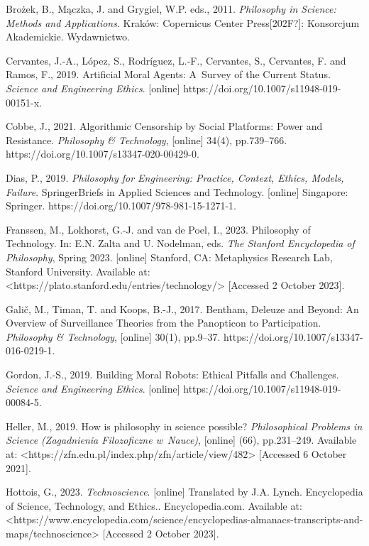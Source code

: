 Brożek, B., Mączka, J. and Grygiel, W.P. eds., 2011. \textit{Philosophy in Science: Methods and Applications}. Kraków: Copernicus Center Press[202F?]: Konsorcjum Akademickie. Wydawnictwo.



Cervantes, J.-A., López, S., Rodríguez, L.-F., Cervantes, S., Cervantes, F. and Ramos, F., 2019. Artificial Moral Agents: A~Survey of the Current Status. \textit{Science and Engineering Ethics}. [online] https://doi.org/10.1007/s11948-019-00151-x.



Cobbe, J., 2021. Algorithmic Censorship by Social Platforms: Power and Resistance. \textit{Philosophy \& Technology}, [online] 34(4), pp.739–766. https://doi.org/10.1007/s13347-020-00429-0.



Dias, P., 2019. \textit{Philosophy for Engineering: Practice, Context, Ethics, Models, Failure}. SpringerBriefs in Applied Sciences and Technology. [online] Singapore: Springer. https://doi.org/10.1007/978-981-15-1271-1.



Franssen, M., Lokhorst, G.-J. and van de Poel, I., 2023. Philosophy of Technology. In: E.N. Zalta and U. Nodelman, eds. \textit{The Stanford Encyclopedia of Philosophy}, Spring 2023. [online] Stanford, CA: Metaphysics Research Lab, Stanford University. Available at: {\textless}https://plato.stanford.edu/entries/technology/{\textgreater} [Accessed 2 October 2023].



Galič, M., Timan, T. and Koops, B.-J., 2017. Bentham, Deleuze and Beyond: An Overview of Surveillance Theories from the Panopticon to Participation. \textit{Philosophy \& Technology}, [online] 30(1), pp.9–37. https://doi.org/10.1007/s13347-016-0219-1.



Gordon, J.-S., 2019. Building Moral Robots: Ethical Pitfalls and Challenges. \textit{Science and Engineering Ethics}. [online] https://doi.org/10.1007/s11948-019-00084-5.



Heller, M., 2019. How is philosophy in science possible? \textit{Philosophical Problems in Science (Zagadnienia Filozoficzne w~Nauce)}, [online] (66), pp.231–249. Available at: {\textless}https://zfn.edu.pl/index.php/zfn/article/view/482{\textgreater} [Accessed 6 October 2021].



Hottois, G., 2023. \textit{Technoscience}. [online] Translated by J.A. Lynch. Encyclopedia of Science, Technology, and Ethics.. Encyclopedia.com. Available at: {\textless}https://www.encyclopedia.com/science/encyclopedias-almanacs-transcripts-and-maps/technoscience{\textgreater} [Accessed 2 October 2023].



